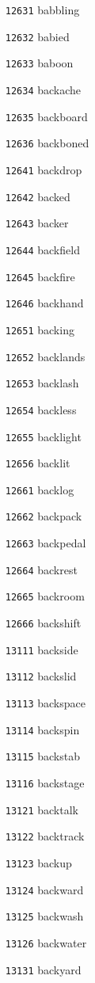 \documentclass[twoside,11pt]{article}
\begin{document}
\begin{multicols}{5}
\begin{enumerate}
\item[\texttt{12631}] babbling
\item[\texttt{12632}] babied
\item[\texttt{12633}] baboon
\item[\texttt{12634}] backache
\item[\texttt{12635}] backboard
\item[\texttt{12636}] backboned
\item[\texttt{12641}] backdrop
\item[\texttt{12642}] backed
\item[\texttt{12643}] backer
\item[\texttt{12644}] backfield
\item[\texttt{12645}] backfire
\item[\texttt{12646}] backhand
\item[\texttt{12651}] backing
\item[\texttt{12652}] backlands
\item[\texttt{12653}] backlash
\item[\texttt{12654}] backless
\item[\texttt{12655}] backlight
\item[\texttt{12656}] backlit
\item[\texttt{12661}] backlog
\item[\texttt{12662}] backpack
\item[\texttt{12663}] backpedal
\item[\texttt{12664}] backrest
\item[\texttt{12665}] backroom
\item[\texttt{12666}] backshift
\item[\texttt{13111}] backside
\item[\texttt{13112}] backslid
\item[\texttt{13113}] backspace
\item[\texttt{13114}] backspin
\item[\texttt{13115}] backstab
\item[\texttt{13116}] backstage
\item[\texttt{13121}] backtalk
\item[\texttt{13122}] backtrack
\item[\texttt{13123}] backup
\item[\texttt{13124}] backward
\item[\texttt{13125}] backwash
\item[\texttt{13126}] backwater
\item[\texttt{13131}] backyard

\end{enumerate}
\end{multicols}
\end{document}

